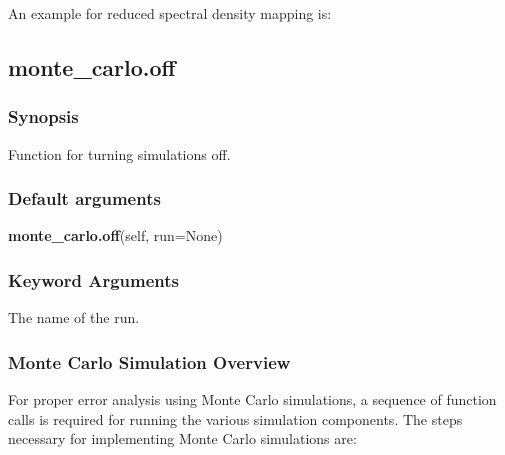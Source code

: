 

An example for reduced spectral density mapping is:








\newpage

\subsection{monte\_carlo.off}


\subsubsection{Synopsis}

Function for turning simulations off.

\subsubsection{Default arguments}

\textsf{\textbf{monte\_carlo.off}(self, run=None)}


\subsubsection{Keyword Arguments}

  The name of the run.

\subsubsection{Monte Carlo Simulation Overview}

For proper error analysis using Monte Carlo simulations, a sequence of function calls is
required for running the various simulation components.  The steps necessary for
implementing Monte Carlo simulations are:

